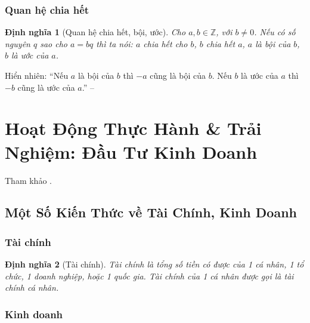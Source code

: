 \documentclass{article}
\numberwithin{equation}{section}
\newtheorem{definition}{Định nghĩa}[section]
\begin{document}
\subsubsection{Quan hệ chia hết}

\begin{definition}[Quan hệ chia hết, bội, ước]
	Cho $a,b\in\mathbb{Z}$, với $b\ne 0$. Nếu có số nguyên $q$ sao cho $a = bq$ thì ta nói: $a$ \emph{chia hết cho} $b$, $b$ \emph{chia hết} $a$, $a$ là \emph{bội} của $b$, $b$ là \emph{ước} của $a$.
\end{definition}
Hiển nhiên: ``Nếu $a$ là bội của $b$ thì $-a$ cũng là bội của $b$. Nếu $b$ là ước của $a$ thì $-b$ cũng là ước của $a$.'' -- \cite[p. 86]{Thai_Anh_Dat_Ha_Loan_Nam_Quang_Toan_6_tap_1}


\section*{Hoạt Động Thực Hành \& Trải Nghiệm: Đầu Tư Kinh Doanh}
Tham khảo \cite[pp. 89--92]{Thai_Anh_Dat_Ha_Loan_Nam_Quang_Toan_6_tap_1}.

\subsection{Một Số Kiến Thức về Tài Chính, Kinh Doanh}

\subsubsection{Tài chính}

\begin{definition}[Tài chính]
	\emph{Tài chính} là tổng số tiền có được của 1 cá nhân, 1 tổ chức, 1 doanh nghiệp, hoặc 1 quốc gia. Tài chính của 1 cá nhân được gọi là \emph{tài chính cá nhân}.
\end{definition}

\subsubsection{Kinh doanh}
\end{document}
